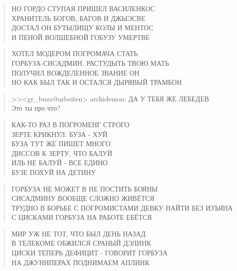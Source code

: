 \poemtitle{***}
\begin{verse}
НО ГОРДО СТУПАЯ ПРИШЕЛ ВАСИЛЕНКОС\\
ХРАНИТЕЛЬ БОГОВ, БАГОВ И ДЖЫЭСВЕ\\
ДОСТАЛ ОН БУТЫЛИЩУ КОЛЫ И МЕНТОС\\
И ПЕНОЙ ВОЛШЕБНОЙ ГОБУЗУ УМЕРТВЕ
\end{verse}

\poemtitle{***}
\begin{verse}
ХОТЕЛ МОДЕРОМ ПОГРОМАЧА СТАТЬ\\
ГОРБУЗА-СИСАДМИН, РАСТУДЫТЬ ТВОЮ МАТЬ\\
ПОЛУЧИЛ ВОЖДЕЛЕННОЕ ЗВАНИЕ ОН\\
НО КАК БЫЛ ТАК И ОСТАЛСЯ ДЫРЯВЫЙ ТРАМБОН
\end{verse}

\poemtitle{***}
\begin{verse}
>><gr\_buza@arbeiten> archidemon: ДА У ТЕБЯ ЖЕ ЛЕБЕДЕВ\\
Это ты про что?
\end{verse}

\poemtitle{***}
\begin{verse}
КАК-ТО РАЗ В ПОГРОМЕНГ СТРОГО\\
ЗЕРТЕ КРИКНУЛ: БУЗА - ХУЙ\\
БУЗА ТУТ ЖЕ ПИШЕТ МНОГО\\
ДИССОВ К ЗЕРТУ, ЧТО БАЛУЙ\\
ИЛЬ НЕ БАЛУЙ - ВСЕ ЕДИНО\\
БУЗЕ ПОХУЙ НА ДЕТИНУ
\end{verse}

\poemtitle{***}
\begin{verse}
ГОРБУЗА НЕ МОЖЕТ В НЕ ПОСТИТЬ БОЯНЫ\\
СИСАДМИНУ ВООБЩЕ СЛОЖНО ЖИВЁТСЯ\\
ТРУДНО В БОРЬБЕ С ПОГРОМИСТАМИ ДЕВКУ НАЙТИ БЕЗ ИЗЪЯНА\\
С ЦИСКАМИ ГОРБУЗА НА РАБОТЕ ЕБЁТСЯ
\end{verse}

\poemtitle{***}
\begin{verse}
МИР УЖ НЕ ТОТ, ЧТО БЫЛ ДЕНЬ НАЗАД\\
В ТЕЛЕКОМЕ ОБЖИЛСЯ СРАНЫЙ ДЭЛИНК\\
ЦИСКИ ТЕПЕРЬ ДЕФИЦИТ - ГОВОРИТ ГОРБУЗА\\
НА ДЖУНИПЕРАХ ПОДНИМАЕМ АПЛИНК
\end{verse}


